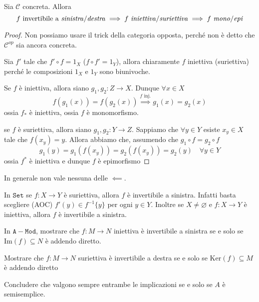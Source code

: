 \begin{proposition}{}
    Sia \(\mathcal{C}\) concreta. Allora
    \[
      f \text{ invertibile a \emph{sinistra}/\emph{destra}} \implies f \text{ \emph{iniettiva}/\emph{suriettiva}} \implies f \text{ \emph{mono}/\emph{epi}}
    \]
\end{proposition}
\begin{proof}{}
    Non possiamo usare il trick della categoria opposta, perché non è detto che
    \(\mathcal{C}^{op}\) sia ancora concreta.

    Sia \(f'\) tale che \(f' \circ f = 1_X\) (\(f \circ f' = 1_Y\)), allora
    chiaramente \(f\) iniettiva (suriettiva) perché le composizioni \(1_X\) e \(1_Y\) sono biunivoche.

    Se \(f\) è iniettiva, allora siano \(g_{1}, g_{2}: Z \to X\). Dunque \(\forall x \in X\) 
    \[
      f{(g_{1}{(x)})} = f{(g_{2}{(x)})} \overset{f \text{ inj.}}{\implies } g_{1}{(x)} = g_{2}{(x)}
    \]
    ossia \(f_*\) è iniettiva, ossia \(f\) è monomorfismo.

    se \(f\) è suriettiva, allora siano \(
    g_{1}, g_{2} : Y \to Z\). Sappiamo che \(\forall y \in Y\) esiste \(x_y \in X\) tale che \(f{(x_y)} = y\). Allora abbiamo che, assumendo che \(g_{1}\circ f = g_{2}\circ f\) 
    \[
        g_{1}{(y)} = g_{1}{(f{(x_y)})} = g_{2}{(f{(x_y)})} = g_{2}{(y)} \quad \forall y \in Y
    \]
    ossia \(f^{*}\) è iniettiva e dunque \(f\) è epimorfismo
\end{proof}

In generale non vale nessuna delle \(\impliedby\).
\begin{example}{}
    In \(\mathtt{Set}\) se \(f : X \to Y\) è suriettiva, allora \(f\) è invertibile a
    sinistra. Infatti basta scegliere (AOC) \(f'{(y)} \in f^{-1}\{y\} \) per
    ogni \(y \in Y\). Inoltre se \(X \neq \varnothing\) e \(f : X \to Y\) è
    iniettiva, allora \(f\) è invertibile a sinistra.
\end{example}

\begin{eser}{}
    In \(\mathtt{A-Mod}\), mostrare che \(f : M\to N\) iniettiva è invertibile a
    sinistra se e solo se \(\mathrm{Im}{(f)} \subseteq N \) è addendo diretto.

    Mostrare che \(f : M \to N\) suriettiva è invertibile a destra se e solo se
    \(\mathrm{Ker}{(f)} \subseteq M \) è addendo diretto

    Concludere che valgono sempre entrambe le implicazioni se e solo se \(A\) è
    semisemplice.
\end{eser}

